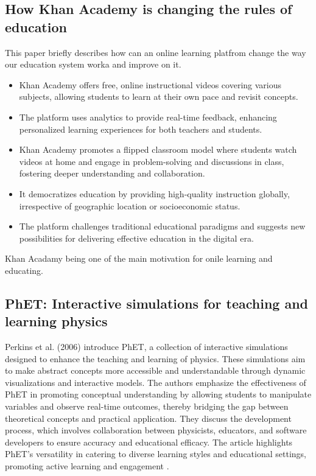 \subsection*{How Khan Academy is changing the rules of education}
This paper briefly describes how can an online learning platfrom change the way our education system worka and improve on it.
\begin{itemize}
    \item Khan Academy offers free, online instructional videos covering various subjects, allowing students to learn at their own pace and revisit concepts.
    
    \item The platform uses analytics to provide real-time feedback, enhancing personalized learning experiences for both teachers and students.
    
    \item Khan Academy promotes a flipped classroom model where students watch videos at home and engage in problem-solving and discussions in class, fostering deeper understanding and collaboration.
    
    \item It democratizes education by providing high-quality instruction globally, irrespective of geographic location or socioeconomic status.
    
    \item The platform challenges traditional educational paradigms and suggests new possibilities for delivering effective education in the digital era.
\end{itemize}
Khan Acadamy being one of the main motivation for onile learning and educating.
\cite{thompson2011khan}
\subsection*{PhET: Interactive simulations for teaching and learning physics}
Perkins et al. (2006) introduce PhET, a collection of interactive simulations designed to enhance the teaching and learning of physics. These simulations aim to make abstract concepts more accessible and understandable through dynamic visualizations and interactive models. The authors emphasize the effectiveness of PhET in promoting conceptual understanding by allowing students to manipulate variables and observe real-time outcomes, thereby bridging the gap between theoretical concepts and practical application. They discuss the development process, which involves collaboration between physicists, educators, and software developers to ensure accuracy and educational efficacy. The article highlights PhET's versatility in catering to diverse learning styles and educational settings, promoting active learning and engagement \cite{perkins2006phet}.

